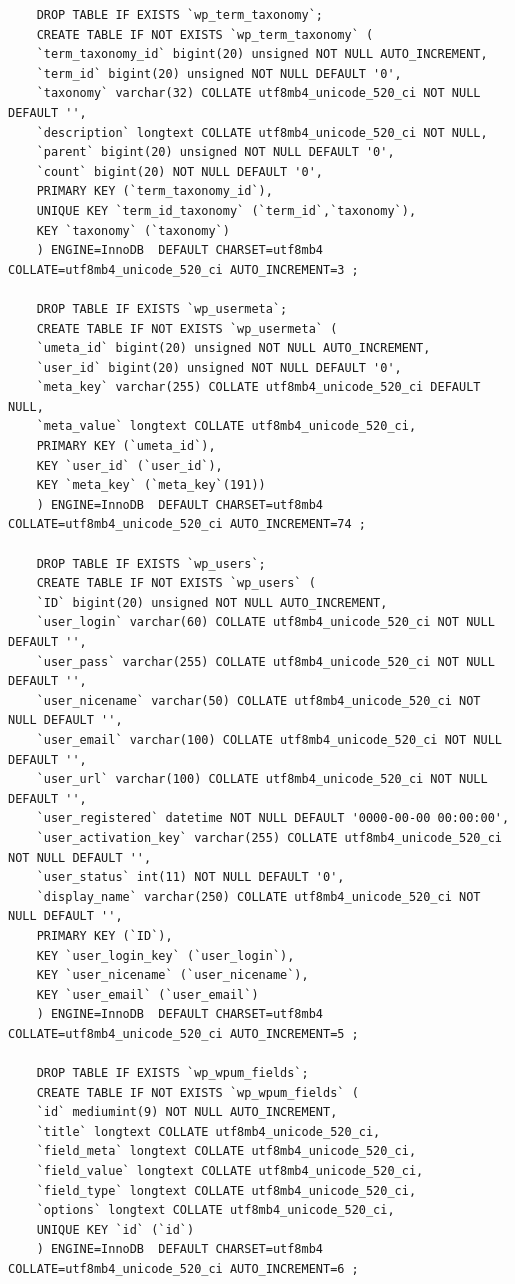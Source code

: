 \documentclass[10pt,a4paper]{article}
\begin{document}
\begin{lstlisting}
	DROP TABLE IF EXISTS `wp_term_taxonomy`;
	CREATE TABLE IF NOT EXISTS `wp_term_taxonomy` (
	`term_taxonomy_id` bigint(20) unsigned NOT NULL AUTO_INCREMENT,
	`term_id` bigint(20) unsigned NOT NULL DEFAULT '0',
	`taxonomy` varchar(32) COLLATE utf8mb4_unicode_520_ci NOT NULL DEFAULT '',
	`description` longtext COLLATE utf8mb4_unicode_520_ci NOT NULL,
	`parent` bigint(20) unsigned NOT NULL DEFAULT '0',
	`count` bigint(20) NOT NULL DEFAULT '0',
	PRIMARY KEY (`term_taxonomy_id`),
	UNIQUE KEY `term_id_taxonomy` (`term_id`,`taxonomy`),
	KEY `taxonomy` (`taxonomy`)
	) ENGINE=InnoDB  DEFAULT CHARSET=utf8mb4 COLLATE=utf8mb4_unicode_520_ci AUTO_INCREMENT=3 ;
	
	DROP TABLE IF EXISTS `wp_usermeta`;
	CREATE TABLE IF NOT EXISTS `wp_usermeta` (
	`umeta_id` bigint(20) unsigned NOT NULL AUTO_INCREMENT,
	`user_id` bigint(20) unsigned NOT NULL DEFAULT '0',
	`meta_key` varchar(255) COLLATE utf8mb4_unicode_520_ci DEFAULT NULL,
	`meta_value` longtext COLLATE utf8mb4_unicode_520_ci,
	PRIMARY KEY (`umeta_id`),
	KEY `user_id` (`user_id`),
	KEY `meta_key` (`meta_key`(191))
	) ENGINE=InnoDB  DEFAULT CHARSET=utf8mb4 COLLATE=utf8mb4_unicode_520_ci AUTO_INCREMENT=74 ;
	
	DROP TABLE IF EXISTS `wp_users`;
	CREATE TABLE IF NOT EXISTS `wp_users` (
	`ID` bigint(20) unsigned NOT NULL AUTO_INCREMENT,
	`user_login` varchar(60) COLLATE utf8mb4_unicode_520_ci NOT NULL DEFAULT '',
	`user_pass` varchar(255) COLLATE utf8mb4_unicode_520_ci NOT NULL DEFAULT '',
	`user_nicename` varchar(50) COLLATE utf8mb4_unicode_520_ci NOT NULL DEFAULT '',
	`user_email` varchar(100) COLLATE utf8mb4_unicode_520_ci NOT NULL DEFAULT '',
	`user_url` varchar(100) COLLATE utf8mb4_unicode_520_ci NOT NULL DEFAULT '',
	`user_registered` datetime NOT NULL DEFAULT '0000-00-00 00:00:00',
	`user_activation_key` varchar(255) COLLATE utf8mb4_unicode_520_ci NOT NULL DEFAULT '',
	`user_status` int(11) NOT NULL DEFAULT '0',
	`display_name` varchar(250) COLLATE utf8mb4_unicode_520_ci NOT NULL DEFAULT '',
	PRIMARY KEY (`ID`),
	KEY `user_login_key` (`user_login`),
	KEY `user_nicename` (`user_nicename`),
	KEY `user_email` (`user_email`)
	) ENGINE=InnoDB  DEFAULT CHARSET=utf8mb4 COLLATE=utf8mb4_unicode_520_ci AUTO_INCREMENT=5 ;
	
	DROP TABLE IF EXISTS `wp_wpum_fields`;
	CREATE TABLE IF NOT EXISTS `wp_wpum_fields` (
	`id` mediumint(9) NOT NULL AUTO_INCREMENT,
	`title` longtext COLLATE utf8mb4_unicode_520_ci,
	`field_meta` longtext COLLATE utf8mb4_unicode_520_ci,
	`field_value` longtext COLLATE utf8mb4_unicode_520_ci,
	`field_type` longtext COLLATE utf8mb4_unicode_520_ci,
	`options` longtext COLLATE utf8mb4_unicode_520_ci,
	UNIQUE KEY `id` (`id`)
	) ENGINE=InnoDB  DEFAULT CHARSET=utf8mb4 COLLATE=utf8mb4_unicode_520_ci AUTO_INCREMENT=6 ;
	
	\end{lstlisting}
\newpage
\end{document}
